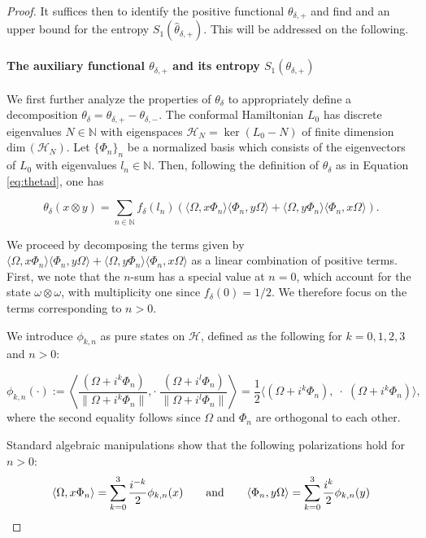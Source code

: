 \documentclass[a4paper,12pt]{article}
\theoremstyle{plain}
\theoremstyle{definition}
\theoremstyle{remark}
\newcommand{\inner}  [2]{\langle #1 , #2 \rangle}
\newcommand{\binner} [2]{\big\langle #1 , #2 \big\rangle}
\def\NN{{\mathbb N}}
\def\H{{\mathcal H}}
\def\dim{\mathrm{dim}\,}
\def\<{\langle}
\def\>{\rangle}
\begin{document}
\begin{proof}
It suffices then to identify the positive functional $\theta_{\delta,+}$ and find and an upper bound for the entropy $S_1(\hat{\theta}_{\delta,+})$. This will be addressed on the following.



\paragraph{The auxiliary functional $\theta_{\delta,+}$ and its entropy $S_1(\theta_{\delta,+})$}

We first further analyze the properties of $\theta_\delta$ to appropriately define a decomposition $\theta_\delta = \theta_{\delta,+} - \theta_{\delta,-}$.
The conformal Hamiltonian $L_0$ has discrete eigenvalues $N\in\mathbb{N}$ with eigenspaces $\H_N=\ker(L_0-N)$ of finite dimension
$\dim(\H_N)$. Let $\{\Phi_n\}_n$ be a normalized basis which consists of the eigenvectors of $L_0$ with eigenvalues $l_n \in \mathbb{N}$. Then, following the definition of $\theta_\delta$ as in Equation \eqref{eq:thetad}, one has

\begin{equation}\label{eq:thetan}
  \theta_\delta(x\otimes y) = \sum_{n\in \NN} f_\delta(l_n)\left(
  \inner{\Omega}{x\Phi_n}\inner{\Phi_n}{y\Omega} +
  \inner{\Omega}{y\Phi_n}\inner{\Phi_n}{x\Omega} \right).
\end{equation}

We proceed by decomposing the terms given by $\inner{\Omega}{x\Phi_n}\inner{\Phi_n}{y\Omega} + \inner{\Omega}{y\Phi_n}\inner{\Phi_n}{x\Omega}$ as a linear combination of positive terms.
First, we note that the $n$-sum has a special value at $n=0$, which account for the state $\omega\otimes\omega$, with multiplicity one since $f_\delta(0)=1/2$. We therefore focus on the terms corresponding to $n>0$.

We introduce $\phi_{k,n}$ as pure states on $\H$, defined as the following for $k = 0,1,2,3$ and $n>0$:

\begin{equation*}%
  \phi_{k,n}(\cdot) := \left\<\frac{(\Omega+i^k\Phi_n)}{\|\Omega+i^k\Phi_n\|},
   \cdot \; \frac{(\Omega+i^l\Phi_n)}{\|\Omega+i^l\Phi_n\|}\right\>
  = \frac{1}{2} \binner{(\Omega+i^k\Phi_n)}{\;\cdot\; (\Omega+i^k\Phi_n)},
\end{equation*}
where the second equality follows since $\Omega$ and $\Phi_n$ are orthogonal to each other.

Standard algebraic manipulations show that the following polarizations hold for $n>0$:
\[\inner{\Omega}{x\Phi_n} = \sum_{k=0}^3 \frac{i^{-k}}{2}\phi_{k,n}(x)
  \qquad {\rm and } \qquad
  \inner{\Phi_n}{y\Omega} = \sum_{k=0}^3 \frac{i^{k}}{2}\phi_{k,n}(y)\]


\end{proof}
\end{document}

